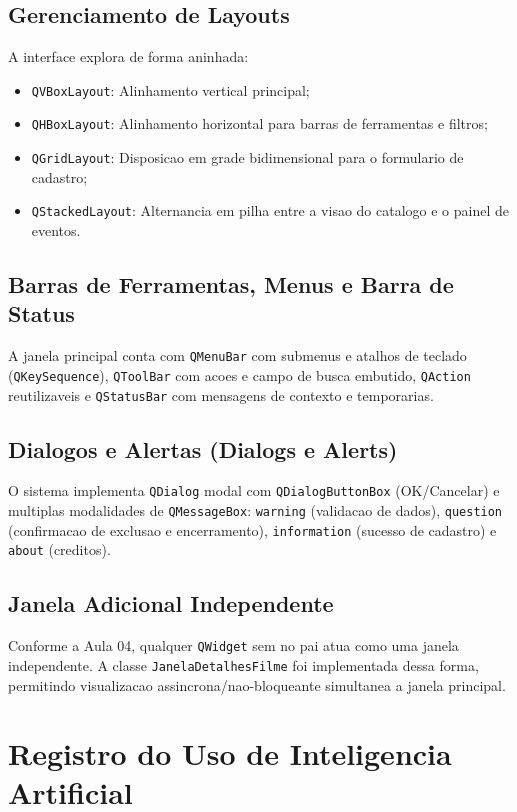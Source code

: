 ﻿\documentclass[12pt]{article}
\begin{document}
\subsection{Gerenciamento de Layouts}
A interface explora de forma aninhada:
\begin{itemize}
    \item \texttt{QVBoxLayout}: Alinhamento vertical principal;
    \item \texttt{QHBoxLayout}: Alinhamento horizontal para barras de ferramentas e filtros;
    \item \texttt{QGridLayout}: Disposicao em grade bidimensional para o formulario de cadastro;
    \item \texttt{QStackedLayout}: Alternancia em pilha entre a visao do catalogo e o painel de eventos.
\end{itemize}

\subsection{Barras de Ferramentas, Menus e Barra de Status}
A janela principal conta com \texttt{QMenuBar} com submenus e atalhos de teclado (\texttt{QKeySequence}), \texttt{QToolBar} com acoes e campo de busca embutido, \texttt{QAction} reutilizaveis e \texttt{QStatusBar} com mensagens de contexto e temporarias.

\subsection{Dialogos e Alertas (Dialogs e Alerts)}
O sistema implementa \texttt{QDialog} modal com \texttt{QDialogButtonBox} (OK/Cancelar) e multiplas modalidades de \texttt{QMessageBox}: \texttt{warning} (validacao de dados), \texttt{question} (confirmacao de exclusao e encerramento), \texttt{information} (sucesso de cadastro) e \texttt{about} (creditos).

\subsection{Janela Adicional Independente}
Conforme a Aula 04, qualquer \texttt{QWidget} sem no pai atua como uma janela independente. A classe \texttt{JanelaDetalhesFilme} foi implementada dessa forma, permitindo visualizacao assincrona/nao-bloqueante simultanea a janela principal.

\section{Registro do Uso de Inteligencia Artificial}
\end{document}
